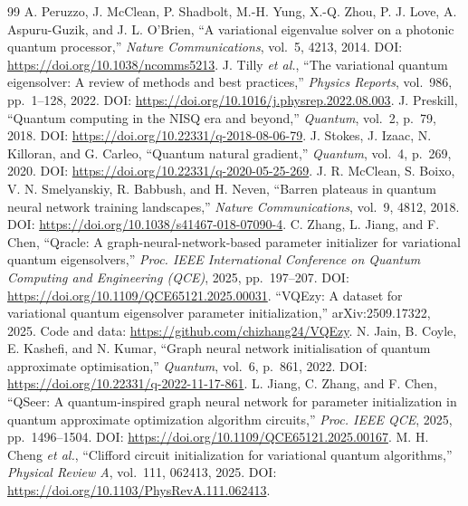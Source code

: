 \documentclass{ssnreview}
\begin{document}
\begin{thebibliography}{99}
 A. Peruzzo, J. McClean, P. Shadbolt, M.-H. Yung, X.-Q. Zhou, P. J. Love, A. Aspuru-Guzik, and J. L. O'Brien, ``A variational eigenvalue solver on a photonic quantum processor,'' \textit{Nature Communications}, vol.~5, 4213, 2014. DOI: \url{https://doi.org/10.1038/ncomms5213}.
 J. Tilly \textit{et al.}, ``The variational quantum eigensolver: A review of methods and best practices,'' \textit{Physics Reports}, vol.~986, pp.~1--128, 2022. DOI: \url{https://doi.org/10.1016/j.physrep.2022.08.003}.
 J. Preskill, ``Quantum computing in the NISQ era and beyond,'' \textit{Quantum}, vol.~2, p.~79, 2018. DOI: \url{https://doi.org/10.22331/q-2018-08-06-79}.
 J. Stokes, J. Izaac, N. Killoran, and G. Carleo, ``Quantum natural gradient,'' \textit{Quantum}, vol.~4, p.~269, 2020. DOI: \url{https://doi.org/10.22331/q-2020-05-25-269}.
 J. R. McClean, S. Boixo, V. N. Smelyanskiy, R. Babbush, and H. Neven, ``Barren plateaus in quantum neural network training landscapes,'' \textit{Nature Communications}, vol.~9, 4812, 2018. DOI: \url{https://doi.org/10.1038/s41467-018-07090-4}.
 C. Zhang, L. Jiang, and F. Chen, ``Qracle: A graph-neural-network-based parameter initializer for variational quantum eigensolvers,'' \textit{Proc. IEEE International Conference on Quantum Computing and Engineering (QCE)}, 2025, pp.~197--207. DOI: \url{https://doi.org/10.1109/QCE65121.2025.00031}.
 ``VQEzy: A dataset for variational quantum eigensolver parameter initialization,'' arXiv:2509.17322, 2025. Code and data: \url{https://github.com/chizhang24/VQEzy}.
 N. Jain, B. Coyle, E. Kashefi, and N. Kumar, ``Graph neural network initialisation of quantum approximate optimisation,'' \textit{Quantum}, vol.~6, p.~861, 2022. DOI: \url{https://doi.org/10.22331/q-2022-11-17-861}.
 L. Jiang, C. Zhang, and F. Chen, ``QSeer: A quantum-inspired graph neural network for parameter initialization in quantum approximate optimization algorithm circuits,'' \textit{Proc. IEEE QCE}, 2025, pp.~1496--1504. DOI: \url{https://doi.org/10.1109/QCE65121.2025.00167}.
 M. H. Cheng \textit{et al.}, ``Clifford circuit initialization for variational quantum algorithms,'' \textit{Physical Review A}, vol.~111, 062413, 2025. DOI: \url{https://doi.org/10.1103/PhysRevA.111.062413}.

\end{thebibliography}
\end{document}
